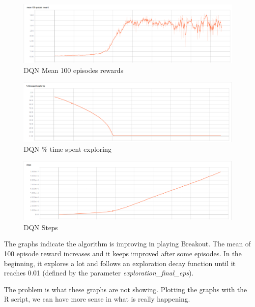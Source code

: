 \documentclass[11pt,twoside,a4paper]{article}
\begin{document}
\begin{figure}[H]
  \includegraphics[width=\linewidth]{images/graphs/dqn-mean-100-episode-reward-clean.png}
  \caption{DQN Mean 100 episodes rewards}
  \label{fig:dqn-mean-100-episodes-rewards}
\end{figure}

\begin{figure}[H]
  \includegraphics[width=\linewidth]{images/graphs/dqn-percent-time-spent-exploring-clean.png}
  \caption{DQN \% time spent exploring}
  \label{fig:dqn-percent-time-spent-exploring}
\end{figure}

\begin{figure}[H]
  \includegraphics[width=\linewidth]{images/graphs/dqn-steps-clean.png}
  \caption{DQN Steps}
  \label{fig:dqn-steps-clean}
\end{figure}

The graphs indicate the algorithm is improving in playing Breakout. The mean of
100 episode reward increases and it keeps improved after some episodes. In the
beginning, it explores a lot and follows an exploration decay function until it
reaches 0.01 (defined by the parameter \textit{exploration\_final\_eps}).

The problem is what these graphs are not showing. Plotting the graphs with the R
script, we can have more sense in what is really happening.
\end{document}
